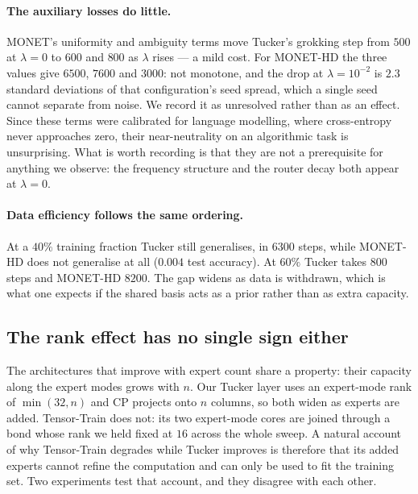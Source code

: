 \paragraph{The auxiliary losses do little.} MONET's uniformity and ambiguity
terms move Tucker's grokking step from $500$ at $\lambda = 0$ to $600$ and
$800$ as $\lambda$ rises --- a mild cost. For MONET-HD the three values give $6500$, $7600$ and $3000$: not monotone, and
the drop at $\lambda = 10^{-2}$ is $2.3$ standard deviations of that
configuration's seed spread, which a single seed cannot separate from noise. We
record it as unresolved rather than as an effect. Since these terms were calibrated for language
modelling, where cross-entropy never approaches zero, their near-neutrality on
an algorithmic task is unsurprising. What is worth recording is that they are
not a prerequisite for anything we observe: the frequency structure and the
router decay both appear at $\lambda = 0$.

\paragraph{Data efficiency follows the same ordering.} At a $40\%$ training
fraction Tucker still generalises, in $6300$ steps, while MONET-HD does not
generalise at all ($0.004$ test accuracy). At $60\%$ Tucker takes $800$ steps
and MONET-HD $8200$. The gap widens as data is withdrawn, which is what one
expects if the shared basis acts as a prior rather than as extra capacity.

\subsection{The rank effect has no single sign either}
\label{sec:res-rank}

The architectures that improve with expert count share a property: their
capacity along the expert modes grows with $n$. Our Tucker layer uses an
expert-mode rank of $\min(32, n)$ and CP projects onto $n$ columns, so both
widen as experts are added. Tensor-Train does not: its two expert-mode cores
are joined through a bond whose rank we held fixed at $16$ across the whole
sweep. A natural account of why Tensor-Train degrades while Tucker improves is
therefore that its added experts cannot refine the computation and can only be
used to fit the training set. Two experiments test that account, and they
disagree with each other.

